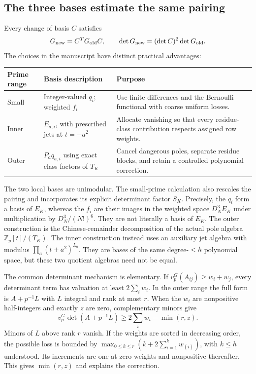 \documentclass[11pt]{article}
\theoremstyle{definition}
\theoremstyle{remark}\newtheorem*{remark}{Remark}
\newcommand{\Z}{\mathbb Z}
\begin{document}
\subsection{The three bases estimate the same pairing}
Every change of basis $C$ satisfies
\begin{equation}\label{eq:congruence}
 G_{\rm new}=C^TG_{\rm old}C,\qquad
 \det G_{\rm new}=(\det C)^2\det G_{\rm old}.
\end{equation}
The choices in the manuscript have distinct practical advantages:
\begin{center}
\begin{tabular}{>{\raggedright\arraybackslash}p{}>{\raggedright\arraybackslash}p{}>{\raggedright\arraybackslash}p{}}
\toprule
Prime range & Basis description & Purpose\\ \midrule
Small & Integer-valued $q_i$; weighted $f_i$ & Use finite differences and the
Bernoulli functional with coarse uniform losses.\\[4pt]
Inner & $E_{a,i}$, with prescribed jets at $t=-a^2$ & Allocate vanishing so that
every residue-class contribution respects assigned row weights.\\[4pt]
Outer & $P_aq_{a,i}$ using exact class factors of $T_K$ & Cancel dangerous poles,
separate residue blocks, and retain a controlled polynomial correction.\\
\bottomrule
\end{tabular}
\end{center}
The two local bases are unimodular. The small-prime calculation also rescales
the pairing and incorporates its explicit determinant factor $S_K$.
Precisely, the $q_i$ form a basis of $E_K$, whereas the $f_i$ are their images
in the weighted space $D_N^3E_K$ under multiplication by
$D_N^3/(N!)^6$. They are not literally a basis of $E_K$.
The outer construction is the Chinese-remainder decomposition of the actual
pole algebra $\Z_p[t]/(T_K)$. The inner construction instead uses an auxiliary
jet algebra with modulus $\prod_a(t+a^2)^{L_a}$. They are bases of the same
degree-$<h$ polynomial space, but these two quotient algebras need not be equal.

The common determinant mechanism is elementary. If
$v_p^G(A_{ij})\ge w_i+w_j$, every determinant term has valuation at least
$2\sum_iw_i$. In the outer range the full form is
$A+p^{-1}L$ with $L$ integral and rank at most $r$. When the $w_i$ are
nonpositive half-integers and exactly $z$ are zero, complementary minors give
\begin{equation}\label{eq:rank}
 v_p^G\det(A+p^{-1}L)\ge2\sum_iw_i-\min(r,z).
\end{equation}
Minors of $L$ above rank $r$ vanish. If the weights are sorted in decreasing
order, the possible loss is bounded by
$\max_{0\le k\le r}(k+2\sum_{i=1}^k w_{(i)})$, with $k\le h$ understood.
Its increments are one at zero weights and nonpositive thereafter.
This gives $\min(r,z)$ and explains the correction.
\end{document}
